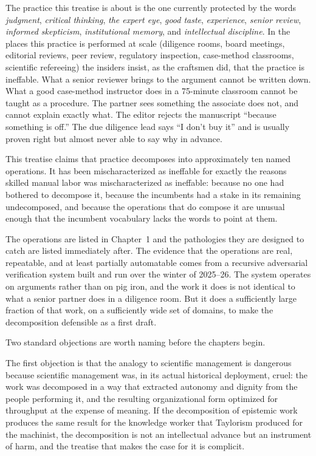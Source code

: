 \documentclass[11pt]{article}
\begin{document}
The practice this treatise is about is the one currently protected by the words \emph{judgment}, \emph{critical thinking}, \emph{the expert eye}, \emph{good taste}, \emph{experience}, \emph{senior review}, \emph{informed skepticism}, \emph{institutional memory}, and \emph{intellectual discipline}. In the places this practice is performed at scale (diligence rooms, board meetings, editorial reviews, peer review, regulatory inspection, case-method classrooms, scientific refereeing) the insiders insist, as the craftsmen did, that the practice is ineffable. What a senior reviewer brings to the argument cannot be written down. What a good case-method instructor does in a 75-minute classroom cannot be taught as a procedure. The partner sees something the associate does not, and cannot explain exactly what. The editor rejects the manuscript ``because something is off.'' The due diligence lead says ``I don't buy it'' and is usually proven right but almost never able to say why in advance.

This treatise claims that practice decomposes into approximately ten named operations. It has been mischaracterized as ineffable for exactly the reasons skilled manual labor was mischaracterized as ineffable: because no one had bothered to decompose it, because the incumbents had a stake in its remaining undecomposed, and because the operations that do compose it are unusual enough that the incumbent vocabulary lacks the words to point at them.

The operations are listed in Chapter~1 and the pathologies they are designed to catch are listed immediately after. The evidence that the operations are real, repeatable, and at least partially automatable comes from a recursive adversarial verification system built and run over the winter of 2025--26. The system operates on arguments rather than on pig iron, and the work it does is not identical to what a senior partner does in a diligence room. But it does a sufficiently large fraction of that work, on a sufficiently wide set of domains, to make the decomposition defensible as a first draft.

Two standard objections are worth naming before the chapters begin.

The first objection is that the analogy to scientific management is dangerous because scientific management was, in its actual historical deployment, cruel: the work was decomposed in a way that extracted autonomy and dignity from the people performing it, and the resulting organizational form optimized for throughput at the expense of meaning. If the decomposition of epistemic work produces the same result for the knowledge worker that Taylorism produced for the machinist, the decomposition is not an intellectual advance but an instrument of harm, and the treatise that makes the case for it is complicit.
\end{document}
